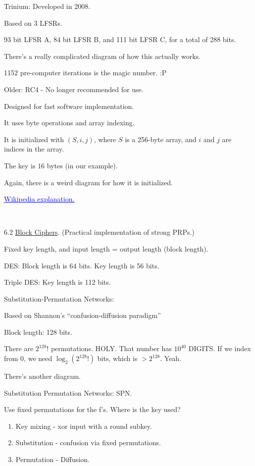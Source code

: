 \documentclass[12pt]{article}
\begin{document}
Trinium: Developed in 2008.

Based on 3 LFSRs.

93 bit LFSR A, 84 bit LFSR B, and 111 bit LFSR C, for a total of 288 bits.

There's a really complicated diagram of how this actually works.

1152 pre-computer iterations is the magic number. :P

Older: RC4 - No longer recommended for use.

Designed for fast software implementation.

It uses byte operations and array indexing.

It is initialized with $(S,i,j)$, where $S$ is a 256-byte array, and $i$ and $j$ are indices in the array.

The key is $16$ bytes (in our example).

Again, there is a weird diagram for how it is initialized.

\href{https://en.wikipedia.org/wiki/RC4}{\textcolor{blue}{\underline{Wikipedia explanation.}}}

\ 

6.2 \underline{Block Ciphers}. (Practical implementation of strong PRPs.)

Fixed key length, and input length = output length (block length).

DES: Block length is 64 bits. Key length is 56 bits.

Triple DES: Key length is 112 bits.

Substitution-Permutation Networks:

Based on Shannon's ``confusion-diffusion paradigm''

Block length: 128 bits.

There are $2^{128}!$ permutations. HOLY. That number has $10^{40}$ DIGITS. If we index from $0$, we need $\log_2(2^{128}!)$ bits, which is $>2^128$. Yeah.

There's another diagram.

Substitution Permutation Networks: SPN.

Use fixed permutations for the f's. Where is the key used?\begin{enumerate}

\item Key mixing - xor input with a round subkey.

\item Substitution - confusion via fixed permutations.

\item Permutation - Diffusion.

\end{enumerate}
\end{document}
